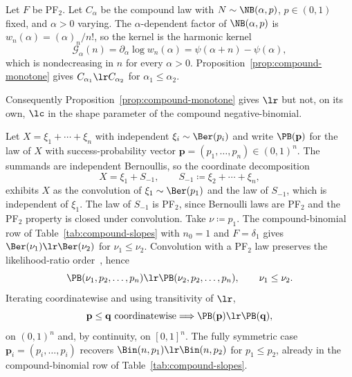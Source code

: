 \documentclass[11pt]{article}
\begin{document}
\begin{example}
\label{ex:compound-shape}
Let \(F\) be PF$_2$. Let \(C_\alpha\) be the compound law with \(N\sim\NB(\alpha,p)\), \(p\in(0,1)\) fixed, and \(\alpha>0\) varying. The \(\alpha\)-dependent factor of \(\NB(\alpha,p)\) is \(w_n(\alpha)=(\alpha)_n/n!\), so the kernel is the harmonic kernel
\[
\mathcal G_\alpha(n)=\partial_\alpha\log w_n(\alpha)=\psi(\alpha+n)-\psi(\alpha),
\]
which is nondecreasing in \(n\) for every \(\alpha>0\). Proposition~\ref{prop:compound-monotone} gives \(C_{\alpha_1}\lr C_{\alpha_2}\) for \(\alpha_1\le\alpha_2\).
\end{example}
Consequently Proposition~\ref{prop:compound-monotone} gives \(\lr\) but not, on its own, \(\lc\) in the shape parameter of the compound negative-binomial.

\begin{example}
\label{ex:poisson-binomial}
Let \(X=\xi_1+\cdots+\xi_n\) with independent \(\xi_i\sim\Ber(p_i)\) and write \(\PB(\mathbf p)\) for the law of \(X\) with success-probability vector \(\mathbf p=(p_1,\dots,p_n)\in(0,1)^n\). The summands are independent Bernoullis, so the coordinate decomposition
\[
X=\xi_1+S_{-1},\qquad S_{-1}\coloneqq \xi_2+\cdots+\xi_n,
\]
exhibits \(X\) as the convolution of \(\xi_1\sim\Ber(p_1)\) and the law of \(S_{-1}\), which is independent of \(\xi_1\). The law of \(S_{-1}\) is PF$_2$, since Bernoulli laws are PF$_2$ and the PF$_2$ property is closed under convolution. Take \(\nu\coloneqq p_1\). The compound-binomial row of Table~\ref{tab:compound-slopes} with \(n_0=1\) and \(F=\delta_1\) gives \(\Ber(\nu_1)\lr\Ber(\nu_2)\) for \(\nu_1\le\nu_2\). Convolution with a PF$_2$ law preserves the likelihood-ratio order~\cite[Theorem~1.C.11]{ShakedShanthikumar}, hence
\[
\PB(\nu_1,p_2,\dots,p_n)\lr\PB(\nu_2,p_2,\dots,p_n),\qquad \nu_1\le\nu_2.
\]
Iterating coordinatewise and using transitivity of \(\lr\),
\[
\mathbf p\le\mathbf q\text{ coordinatewise}
\Longrightarrow
\PB(\mathbf p)\lr\PB(\mathbf q),
\]
on \((0,1)^n\) and, by continuity, on \([0,1]^n\). The fully symmetric case \(\mathbf p_i=(p_i,\dots,p_i)\) recovers \(\Bin(n,p_1)\lr\Bin(n,p_2)\) for \(p_1\le p_2\), already in the compound-binomial row of Table~\ref{tab:compound-slopes}.
\end{example}
\end{document}
